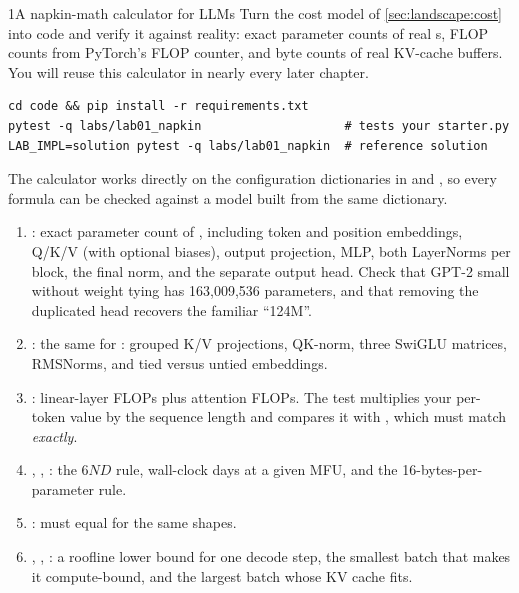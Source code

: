 \begin{labbox}{1}{A napkin-math calculator for LLMs}
Turn the cost model of \cref{sec:landscape:cost} into code and verify it against reality: exact
parameter counts of real s, FLOP counts from PyTorch's FLOP counter, and byte counts of
real KV-cache buffers. You will reuse this calculator in nearly every later chapter.

\begin{lstlisting}[style=shell]
cd code && pip install -r requirements.txt
pytest -q labs/lab01_napkin                    # tests your starter.py
LAB_IMPL=solution pytest -q labs/lab01_napkin  # reference solution
\end{lstlisting}
The calculator works directly on the configuration dictionaries in  and
, so every formula can be checked against a model built from the same dictionary.

\begin{enumerate}
\item {}: exact parameter count of , including token and
  position embeddings, Q/K/V (with optional biases), output projection, MLP, both LayerNorms per block, the
  final norm, and the separate output head. Check that GPT-2 small without weight tying has 163{,}009{,}536
  parameters, and that removing the duplicated head recovers the familiar ``124M''.
\item {}: the same for : grouped K/V projections, QK-norm,
  three SwiGLU matrices, RMSNorms, and tied versus untied embeddings.
\item {}: linear-layer FLOPs plus attention FLOPs. The test
  multiplies your per-token value by the sequence length and compares it with
  , which must match \emph{exactly}.
\item {}, , : the $6ND$ rule, wall-clock
  days at a given MFU, and the 16-bytes-per-parameter rule.
\item {}: must equal  for the same shapes.
\item {}, , : a roofline lower bound for one
  decode step, the smallest batch that makes it compute-bound, and the largest batch whose KV cache fits.
\end{enumerate}


\end{labbox}

